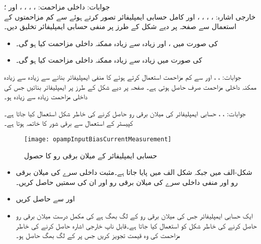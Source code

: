 جوابات:
داخلی مزاحمت: ، ، ، ،  اور  ؛\\
خارجی اشارہ: ، ، ، ،  اور 
 
کامل حسابی ایمپلیفائر تصور کرتے ہوئے  سے کم مزاحمتوں کے استعمال سے  صفحہ  پر دیے شکل  کے طرز پر منفی حسابی ایمپلیفائر تخلیق دیں۔ 
\begin{itemize}
\item
  کی صورت میں ،  اور زیادہ سے زیادہ ممکنہ داخلی مزاحمت کیا ہو گی۔ 
\item
{} کی صورت میں زیادہ سے زیادہ ممکنہ داخلی مزاحمت کیا ہو گی۔ 
\end{itemize}

جوابات: ، ،  اور  
 سے کم مزاحمت استعمال کرتے ہوئے   کا منفی ایمپلیفائر بنانے سے زیادہ سے زیادہ ممکنہ داخلی مزاحمت صرف  حاصل ہوتی ہے۔ صفحہ  پر دیے شکل  کے طرز پر ایمپلیفائر بنائیں جس کی داخلی مزاحمت زیادہ سے زیادہ ہو۔

جوابات: ، ،  
حسابی ایمپلیفائر کی میلان برقی رو حاصل کرنے کی خاطر شکل  استعمال کیا جاتا ہے۔کپیسٹر کے استعمال سے برقی شور کا خاتمہ ہوتا ہے۔
\begin{figure}
\centering
\texttt{[image: opampInputBiasCurrentMeasurement]}
\caption{حسابی ایمپلیفائر کے میلان برقی رو کا حصول}
\label{شکل__سوال_حسابی_میلان_برقی_رو}
\end{figure}
\begin{itemize}
\item
شکل-الف میں  جبکہ شکل  الف     میں   پایا جاتا ہے۔مثبت داخلی سرے  کی میلان برقی رو  اور منفی داخلی سرے  کی میلان برقی رو   اور ان کی سمتیں حاصل کریں۔
\item
{} اور  سے  حاصل کریں
\item
ایک حسابی ایمپلیفائر جس کی میلان برقی رو  کے لگ بھگ ہے کی مکمل درست میلان برقی رو حاصل کرنے کی خاطر شکل کو استعمال کیا جاتا ہے۔قابل ناپ خارجی اشارہ حاصل کرنے کی خاطر مزاحمت کی وہ قیمت تجویز کریں جس پر  کے لگ بھگ حاصل ہو۔
\end{itemize}

